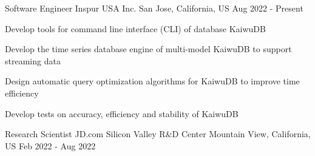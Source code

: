 


\begin{cventries}


\cventry
{Software Engineer} %
{Inspur USA Inc.} %
{San Jose, California, US} %
{Aug 2022 - Present} %
{ %
	\begin{cvitems}
		\item {Develop tools for command line interface (CLI) of database KaiwuDB}
		\item {Develop the time series database engine of multi-model KaiwuDB to support streaming data}
		\item {Design automatic query optimization algorithms for KaiwuDB to improve time efficiency}
		\item {Develop tests on accuracy, efficiency and stability of KaiwuDB}
	\end{cvitems}
}


\cventry
{Research Scientist} %
{JD.com Silicon Valley R\&D Center} %
{Mountain View, California, US} %
{Feb 2022 - Aug 2022} %
{ %
}



\end{cventries}

